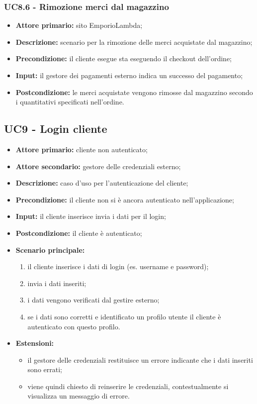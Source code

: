 \subsubsection{UC8.6 - Rimozione merci dal magazzino}
\label{UC8.6}
\begin{itemize}
    \item \textbf{Attore primario:} sito EmporioLambda;
    \item \textbf{Descrizione:} scenario per la rimozione delle merci acquistate dal magazzino;
    \item \textbf{Precondizione:} il cliente esegue sta eseguendo il checkout dell'ordine;
    \item \textbf{Input:} il gestore dei pagamenti esterno indica un successo del pagamento;
    \item \textbf{Postcondizione:} le merci acquistate vengono rimosse dal magazzino secondo i quantitativi specificati nell'ordine.
\end{itemize}

\subsection{UC9 - Login cliente}
\label{UC9}
\begin{itemize}
    \item \textbf{Attore primario:} cliente non autenticato;
    \item \textbf{Attore secondario:} gestore delle credenziali esterno;
    \item \textbf{Descrizione:} caso d'uso per l'autenticazione del cliente;
    \item \textbf{Precondizione:} il cliente non si è ancora autenticato nell'applicazione;
    \item \textbf{Input:} il cliente inserisce invia i dati per il login;
    \item \textbf{Postcondizione:} il cliente è autenticato;
    \item \textbf{Scenario principale:}
    \begin{enumerate}
        \item il cliente inserisce i dati di login (es. username e password);
        \item invia i dati inseriti;
        \item i dati vengono verificati dal gestire esterno;
        \item se i dati sono corretti e identificato un profilo utente il cliente è autenticato con questo profilo.
    \end{enumerate}
    \item \textbf{Estensioni:}
    \begin{itemize}
        \item il gestore delle credenziali restituisce un errore indicante che i dati inseriti sono errati;
        \item viene quindi chiesto di reinserire le credenziali, contestualmente si visualizza un messaggio di errore.
    \end{itemize}
\end{itemize}

